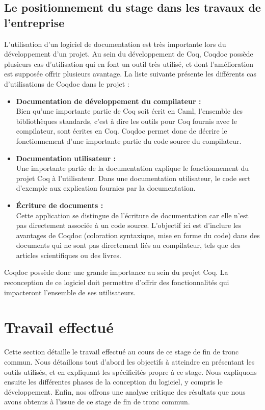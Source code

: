 \documentclass[a4paper, 11pt]{report}
\begin{document}
      \section{Le positionnement du stage dans les travaux de l'entreprise}
      L'utilisation d'un logiciel de documentation est très importante lors du
      développement d'un projet.
      Au sein du développement de Coq, Coqdoc possède plusieurs cas
      d'utilisation qui en font un outil très utilisé, et dont l'amélioration
      est supposée offrir plusieurs avantage. La liste suivante
      présente les différents cas d'utilisations de Coqdoc dans le projet :
      \begin{itemize}
        \item \textbf{Documentation de développement du compilateur :} \\
          Bien qu'une importante partie de Coq soit écrit en Caml, l'ensemble
          des bibliothèques standards, c'est à dire les outils pour Coq
          fournis avec le compilateur, sont écrites en Coq. Coqdoc permet donc
          de décrire le fonctionnement d'une importante partie du code source
          du compilateur.
        \item \textbf{Documentation utilisateur :} \\
          Une importante partie de la documentation explique le fonctionnement
          du projet Coq à l'utilisateur. Dans une documentation utilisateur,
          le code sert d'exemple aux explication fournies par la documentation.
        \item \textbf{Écriture de documents :} \\
          Cette application se distingue de l'écriture de documentation car
          elle n'est pas directement associée à un code source. L'objectif ici
          est d'inclure les avantages de Coqdoc (coloration syntaxique,
          mise en forme du code) dans des documents qui ne sont pas directement
          liés au compilateur, tels que des articles scientifiques ou des
          livres.
      \end{itemize}

      Coqdoc possède donc une grande importance au sein du projet Coq. La
      reconception de ce logiciel doit permettre d'offrir des fonctionnalités
      qui impacteront l'ensemble de ses utilisateurs.

\chapter{Travail effectué}
Cette section détaille le travail effectué au cours de ce stage de fin de tronc
commun. Nous détaillons tout d'abord les objectifs à atteindre en présentant
les outils utilisés, et en expliquant les spécificités propre à ce stage.
Nous expliquons ensuite les différentes phases de la conception du logiciel,
y compris le développement. Enfin, nos offrons une analyse critique des
résultats que nous avons obtenus à l'issue de ce stage de fin de tronc commun.
\end{document}
